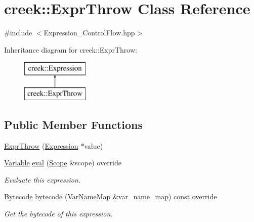 \hypertarget{classcreek_1_1_expr_throw}{}\section{creek\+:\+:Expr\+Throw Class Reference}
\label{classcreek_1_1_expr_throw}


{\ttfamily \#include $<$Expression\+\_\+\+Control\+Flow.\+hpp$>$}

Inheritance diagram for creek\+:\+:Expr\+Throw\+:\begin{figure}[H]
\begin{center}
\leavevmode
\includegraphics[height=2.000000cm]{classcreek_1_1_expr_throw}
\end{center}
\end{figure}
\subsection*{Public Member Functions}
\begin{DoxyCompactItemize}
\item 
\hyperlink{classcreek_1_1_expr_throw_a05aea34c133af92503d2e2dfcb1365b9}{Expr\+Throw} (\hyperlink{classcreek_1_1_expression}{Expression} $\ast$value)
\item 
\hyperlink{classcreek_1_1_variable}{Variable} \hyperlink{classcreek_1_1_expr_throw_a8402ea5b977841ae1733d0f76d7185bf}{eval} (\hyperlink{classcreek_1_1_scope}{Scope} \&scope) override
\begin{DoxyCompactList}\small\item\em Evaluate this expression. \end{DoxyCompactList}\item 
\hyperlink{classcreek_1_1_bytecode}{Bytecode} \hyperlink{classcreek_1_1_expr_throw_a03e9e003c77366594aa79ee56b197c08}{bytecode} (\hyperlink{classcreek_1_1_var_name_map}{Var\+Name\+Map} \&var\+\_\+name\+\_\+map) const  override\hypertarget{classcreek_1_1_expr_throw_a03e9e003c77366594aa79ee56b197c08}{}\label{classcreek_1_1_expr_throw_a03e9e003c77366594aa79ee56b197c08}

\begin{DoxyCompactList}\small\item\em Get the bytecode of this expression. \end{DoxyCompactList}\end{DoxyCompactItemize}


